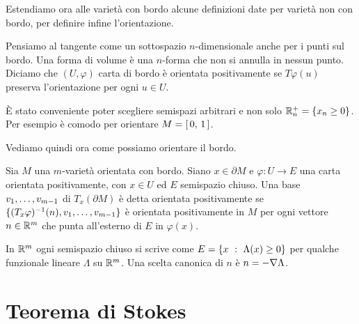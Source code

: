 Estendiamo ora alle varietà con bordo alcune definizioni date per varietà non con bordo, per definire infine l'orientazione.

Pensiamo al tangente come un sottospazio $n$-dimensionale anche per i punti sul bordo.
Una forma di volume è una $n$-forma che non si annulla in nessun punto. Diciamo che $(U,\varphi)$ carta di bordo è orientata positivamente se $T\varphi(u)$ preserva l'orientazione per ogni $u\in U$.

\begin{remark}
	È stato conveniente poter scegliere semispazi arbitrari e non solo $\R_n^+ = \{x_n\ge 0\}$. Per esempio è comodo per orientare $M = \cc 01$.
\end{remark}

Vediamo quindi ora come possiamo orientare il bordo.
\begin{definition}
	Sia $M$ una $m$-varietà orientata con bordo. Siano $x\in \partial M$ e $\varphi:U \to E$ una carta orientata positivamente, con $x\in U$ ed $E$ semispazio chiuso. Una base $\seqb v{m-1},$ di $T_x(\partial M)$ è detta orientata positivamente se $\{ (T_x\varphi)^{-1} (n), \seqb v{m-1}, \}$ è orientata positivamente in $M$ per ogni vettore $n\in\R^m$ che punta all'esterno di $E$ in $\varphi(x)$.
\end{definition}

\begin{remark}
	In $\R^m$ ogni semispazio chiuso si scrive come $E = \{x \suchthat \Lambda(x) \ge 0\}$ per qualche funzionale lineare $\Lambda$ su $\R^m$. Una scelta canonica di $n$ è $n = -\grad \Lambda$.
\end{remark}



\section{Teorema di Stokes}

